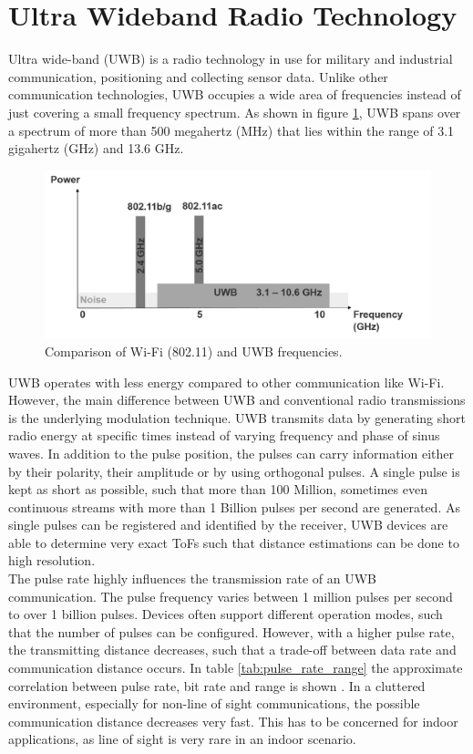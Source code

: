 \section{Ultra Wideband Radio Technology}
Ultra wide-band (UWB) is a radio technology in use for military and industrial communication, positioning and collecting sensor data. Unlike other communication technologies, UWB occupies a wide area of frequencies instead of just covering a small frequency spectrum. As shown in figure \ref{fig:frequency_spectrum}, UWB spans over a spectrum of more than 500 megahertz (MHz) that lies within the range of 3.1 gigahertz (GHz) and 13.6 GHz.
\begin{figure}[th]
\centering
\includegraphics[width=1.0\textwidth]{Figures/frequency_spectrum}
\decoRule
\caption[UWB Frequency Spectrum]{Comparison of Wi-Fi (802.11) and UWB frequencies.}
\label{fig:frequency_spectrum}
\end{figure}
UWB operates with less energy compared to other communication like Wi-Fi. However, the main difference between UWB and conventional radio transmissions is the underlying modulation technique. UWB transmits data by generating short radio energy at specific times instead of varying frequency and phase of sinus waves. In addition to the pulse position, the pulses can carry information either by their polarity, their amplitude or by using orthogonal pulses.
A single pulse is kept as short as possible, such that more than 100 Million, sometimes even continuous streams with more than 1 Billion pulses per second are generated. As single pulses can be registered and identified by the receiver, UWB devices are able to determine very exact ToFs such that distance estimations can be done to high resolution.\\
\noindent\hspace*{5mm}%
The pulse rate highly influences the transmission rate of an UWB communication. The pulse frequency varies between 1 million pulses per second to over 1 billion pulses. Devices often support different operation modes, such that the number of pulses can be configured. However, with a higher pulse rate, the transmitting distance decreases, such that a trade-off between data rate and communication distance occurs. In table \ref{tab:pulse_rate_range} the approximate correlation between pulse rate, bit rate and range is shown \cite{ITU}. In a cluttered environment, especially for non-line of sight communications, the possible communication distance decreases very fast. This has to be concerned for indoor applications, as line of sight is very rare in an indoor scenario.

